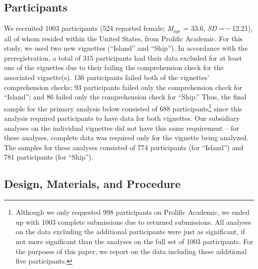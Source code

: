 \documentclass[
  man,floatsintext]{apa6}
\begin{document}
\hypertarget{participants}{%
\subsection{Participants}\label{participants}}

We recruited 1003 participants (524 reported female; \emph{M}\(_{age}\) = 33.6, \emph{SD} =¬ 12.21), all of whom resided within the United States, from Prolific Academic. For this study, we used two new vignettes (``Island'' and ``Ship''). In accordance with the preregistration, a total of 315 participants had their data excluded for at least one of the vignettes due to their failing the comprehension check for the associated vignette(s). 136 participants failed both of the vignettes' comprehension checks; 93 participants failed only the comprehension check for ``Island''; and 86 failed only the comprehension check for ``Ship.'' Thus, the final sample for the primary analysis below consisted of 688 participants\footnote{Although we only requested 998 participants on Prolific Academic, we ended up with 1003 complete submissions due to returned submissions. All analyses on the data excluding the additional participants were just as significant, if not more significant than the analyses on the full set of 1003 participants. For the purposes of this paper, we report on the data including these additional five participants.} since this analysis required participants to have data for both vignettes. Our subsidiary analyses on the individual vignettes did not have this same requirement -- for these analyses, complete data was required only for the vignette being analyzed. The samples for these analyses consisted of 774 participants (for ``Island'') and 781 participants (for ``Ship'').

\hypertarget{design-materials-and-procedure}{%
\subsection{Design, Materials, and Procedure}\label{design-materials-and-procedure}}
\end{document}
